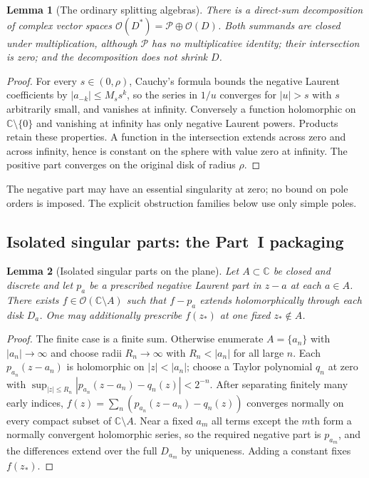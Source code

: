 \documentclass[11pt,letterpaper]{article}
\newtheorem{lemma}[lemma]{Lemma}
\theoremstyle{definition}
\theoremstyle{remark}
\newcommand{\C}{\mathbb C}
\newcommand{\OO}{\mathcal O}
\newcommand{\PP}{\mathcal P}
\numberwithin{equation}{section}
\begin{document}
\begin{lemma}[The ordinary splitting algebras]\label{nab:lem:laurent}
There is a direct-sum decomposition of complex vector spaces
$\OO(D^*)=\PP\oplus\OO(D)$. Both summands are closed under multiplication,
although $\PP$ has no multiplicative identity; their intersection is zero; and
the decomposition does not shrink $D$.
\end{lemma}

\begin{proof}
For every $s\in(0,\rho)$, Cauchy's formula bounds the negative Laurent
coefficients by $|a_{-k}|\leq M_ss^k$, so the series in $1/u$ converges for
$|u|>s$ with $s$ arbitrarily small, and vanishes at infinity. Conversely a
function holomorphic on $\C\setminus\{0\}$ and vanishing at infinity has only
negative Laurent powers. Products retain these properties. A function in the
intersection extends across zero and across infinity, hence is constant on the
sphere with value zero at infinity. The positive part converges on the
original disk of radius $\rho$.
\end{proof}

The negative part may have an essential singularity at zero; no bound on pole
orders is imposed. The explicit obstruction families below use only simple
poles.

\subsection{Isolated singular parts: the Part~I packaging}

\begin{lemma}[Isolated singular parts on the plane]\label{nab:lem:mlplane}
Let $A\subset\C$ be closed and discrete and let $p_a$ be a prescribed negative
Laurent part in $z-a$ at each $a\in A$. There exists $f\in\OO(\C\setminus A)$
such that $f-p_a$ extends holomorphically through each disk $D_a$. One may
additionally prescribe $f(z_*)$ at one fixed $z_*\notin A$.
\end{lemma}

\begin{proof}
The finite case is a finite sum. Otherwise enumerate $A=\{a_n\}$ with
$|a_n|\to\infty$ and choose radii $R_n\to\infty$ with $R_n<|a_n|$ for all
large $n$. Each $p_{a_n}(z-a_n)$ is holomorphic on $|z|<|a_n|$; choose a
Taylor polynomial $q_n$ at zero with
$\sup_{|z|\leq R_n}|p_{a_n}(z-a_n)-q_n(z)|<2^{-n}$. After separating finitely
many early indices, $f(z)=\sum_n(p_{a_n}(z-a_n)-q_n(z))$ converges normally on
every compact subset of $\C\setminus A$. Near a fixed $a_m$ all terms except
the $m$th form a normally convergent holomorphic series, so the required
negative part is $p_{a_m}$, and the differences extend over the full $D_{a_m}$
by uniqueness. Adding a constant fixes $f(z_*)$.
\end{proof}
\end{document}
